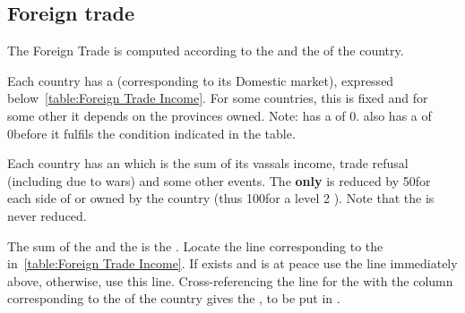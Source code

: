 \subsection{Foreign trade}\label{chIncomes:Foreign Trade}
\aparag The Foreign Trade is computed according to the  and the \FTI of the country.

\aparag Each country has a  (corresponding to
its Domestic market), expressed below~\ref{table:Foreign Trade
  Income}. 
\bparag For some countries, this is fixed and for some other it depends
on the provinces owned.
\bparag Note: \POR has a  of 0\ducats. \RUS
also has a  of 0\ducats before it fulfils the
condition indicated in the table.

\aparag Each country has an  which is the sum
of its vassals income, trade refusal (including due to wars) and some
other events.
\bparag The  \textbf{only} is reduced by
50\ducats for each side of  or  \MNU owned by the
country (thus 100\ducats for a level 2 \MNU).
\bparag Note that the  is never reduced.

\aparag The sum of the  and the  is the .
\bparag Locate the line corresponding to the 
in~\ref{table:Foreign Trade Income}.
\bparag If  exists and is at peace use the line immediately
above, otherwise, use this line.
\bparag Cross-referencing the line for the  with
the column corresponding to the \FTI of the country gives the
, to be put in .

